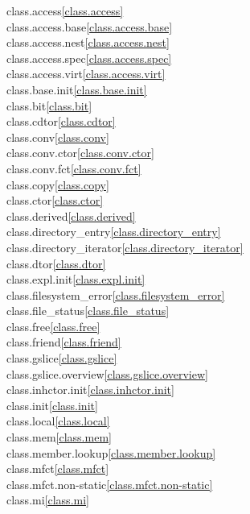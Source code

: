\begin{multicols}{2}
class.access\quad\ref{class.access}\\
class.access.base\quad\ref{class.access.base}\\
class.access.nest\quad\ref{class.access.nest}\\
class.access.spec\quad\ref{class.access.spec}\\
class.access.virt\quad\ref{class.access.virt}\\
class.base.init\quad\ref{class.base.init}\\
class.bit\quad\ref{class.bit}\\
class.cdtor\quad\ref{class.cdtor}\\
class.conv\quad\ref{class.conv}\\
class.conv.ctor\quad\ref{class.conv.ctor}\\
class.conv.fct\quad\ref{class.conv.fct}\\
class.copy\quad\ref{class.copy}\\
class.ctor\quad\ref{class.ctor}\\
class.derived\quad\ref{class.derived}\\
class.directory_entry\quad\ref{class.directory_entry}\\
class.directory_iterator\quad\ref{class.directory_iterator}\\
class.dtor\quad\ref{class.dtor}\\
class.expl.init\quad\ref{class.expl.init}\\
class.filesystem_error\quad\ref{class.filesystem_error}\\
class.file_status\quad\ref{class.file_status}\\
class.free\quad\ref{class.free}\\
class.friend\quad\ref{class.friend}\\
class.gslice\quad\ref{class.gslice}\\
class.gslice.overview\quad\ref{class.gslice.overview}\\
class.inhctor.init\quad\ref{class.inhctor.init}\\
class.init\quad\ref{class.init}\\
class.local\quad\ref{class.local}\\
class.mem\quad\ref{class.mem}\\
class.member.lookup\quad\ref{class.member.lookup}\\
class.mfct\quad\ref{class.mfct}\\
class.mfct.non-static\quad\ref{class.mfct.non-static}\\
class.mi\quad\ref{class.mi}\\

\end{multicols}
